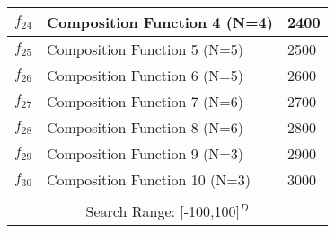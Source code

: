 \begin{table}[!htbp]
\begin{tabular}{|p{0.5cm}|p{5.4cm}|p{0.6cm}|}
\hline
$f_{24}$ & Composition Function 4 (N=4) & 2400\\
\hline
$f_{25}$ & Composition Function 5 (N=5) & 2500\\
\hline
$f_{26}$ & Composition Function 6 (N=5) & 2600\\
\hline
$f_{27}$ & Composition Function 7 (N=6) & 2700\\
\hline
$f_{28}$ & Composition Function 8 (N=6) & 2800 \\
\hline
$f_{29}$ & Composition Function 9 (N=3) & 2900 \\
\hline
$f_{30}$ & Composition Function 10 (N=3) & 3000 \\
\hline
\multicolumn{3}{|c|}{ } \\[0.05ex]
\multicolumn{3}{|c|}{Search Range: [-100,100]$^{D}$ } \\
\hline
\end{tabular}
\vspace{-1mm}
\end{table}

